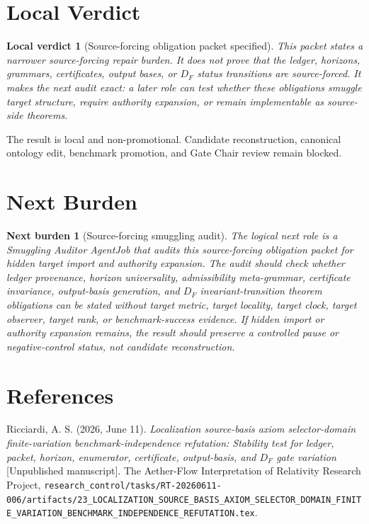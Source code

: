 \documentclass[11pt]{article}
\newtheorem{verdict}{Local verdict}
\newtheorem{nextburden}{Next burden}
\begin{document}
\section{Local Verdict}

\begin{verdict}[Source-forcing obligation packet specified]
This packet states a narrower source-forcing repair burden. It does not prove
that the ledger, horizons, grammars, certificates, output bases, or \(D_F\)
status transitions are source-forced. It makes the next audit exact: a later
role can test whether these obligations smuggle target structure, require
authority expansion, or remain implementable as source-side theorems.
\end{verdict}

The result is local and non-promotional. Candidate reconstruction, canonical
ontology edit, benchmark promotion, and Gate Chair review remain blocked.

\section{Next Burden}

\begin{nextburden}[Source-forcing smuggling audit]
The logical next role is a Smuggling Auditor AgentJob that audits this
source-forcing obligation packet for hidden target import and authority
expansion. The audit should check whether ledger provenance, horizon
universality, admissibility meta-grammar, certificate invariance,
output-basis generation, and \(D_F\) invariant-transition theorem obligations
can be stated without target metric, target locality, target clock, target
observer, target rank, or benchmark-success evidence. If hidden import or
authority expansion remains, the result should preserve a controlled pause
or negative-control status, not candidate reconstruction.
\end{nextburden}

\section*{References}

Ricciardi, A. S. (2026, June 11). \emph{Localization source-basis axiom
selector-domain finite-variation benchmark-independence refutation:
Stability test for ledger, packet, horizon, enumerator, certificate,
output-basis, and \(D_F\) gate variation} [Unpublished manuscript]. The
Aether-Flow Interpretation of Relativity Research Project,
\texttt{research\_control/tasks/RT-20260611-006/artifacts/23\_LOCALIZATION\_SOURCE\_BASIS\_AXIOM\_SELECTOR\_DOMAIN\_FINITE\_VARIATION\_BENCHMARK\_INDEPENDENCE\_REFUTATION.tex}.
\end{document}
